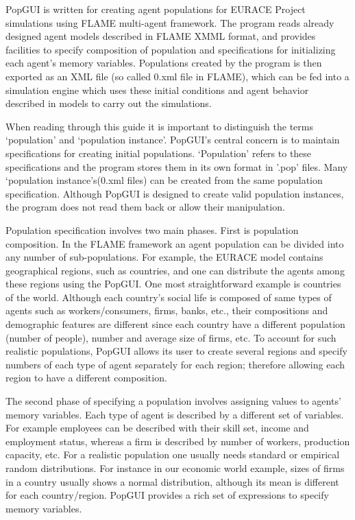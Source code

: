 PopGUI is written for creating agent populations for EURACE  Project simulations using FLAME multi-agent framework. The program reads already designed agent models described in FLAME XMML format, and provides facilities to specify composition of population and specifications for initializing each agent's memory variables. Populations created by the program is then exported as an XML file (so called 0.xml file in FLAME), which can be fed into a simulation engine which uses these initial conditions and agent behavior described in models to carry out the simulations.

When reading through this guide it is important to distinguish the terms `population' and `population instance'. PopGUI's central concern is to maintain specifications for creating initial populations. `Population' refers to these specifications and the program stores them in its own format in '.pop' files. Many `population instance's(0.xml files) can be created from the same population specification. Although PopGUI is designed to create valid population instances, the program does not read them back or allow their manipulation.

Population specification involves two main phases. First is population composition. In the FLAME framework an agent population can be divided into any number of sub-populations. For example, the EURACE model contains geographical regions, such as countries, and one can distribute the agents among these regions using the PopGUI. One most straightforward example is countries of the world. Although each country's social life is composed of same types of agents such as workers/consumers, firms, banks, etc., their compositions and demographic features are different since each country have a different population (number of people), number and average size of firms, etc. To account for such realistic populations, PopGUI allows its user to create several regions and specify numbers of each type of agent separately for each region; therefore allowing each region to have a different composition.

The second phase of specifying a population involves assigning values to agents' memory variables. Each type of agent is described by a different set of variables. For example employees can be described with their skill set, income and employment status, whereas a firm is described by number of workers, production capacity, etc. For a realistic population one usually needs standard or empirical random  distributions. For instance in our economic world example, sizes of firms in a country usually shows a normal distribution, although its mean is different for each country/region. PopGUI provides a rich set of expressions to specify memory variables.


